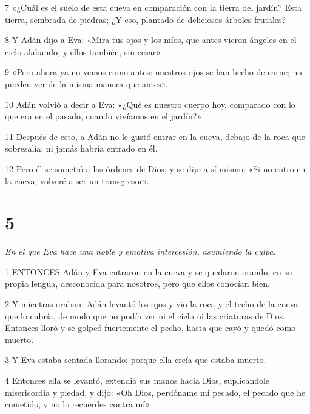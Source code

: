 \par 7 «¿Cuál es el suelo de esta cueva en comparación con la tierra del jardín? Esta tierra, sembrada de piedras; ¿Y eso, plantado de deliciosos árboles frutales?

\par 8 Y Adán dijo a Eva: «Mira tus ojos y los míos, que antes vieron ángeles en el cielo alabando; y ellos también, sin cesar».

\par 9 «Pero ahora ya no vemos como antes: nuestros ojos se han hecho de carne; no pueden ver de la misma manera que antes».

\par 10 Adán volvió a decir a Eva: «¿Qué es nuestro cuerpo hoy, comparado con lo que era en el pasado, cuando vivíamos en el jardín?»

\par 11 Después de esto, a Adán no le gustó entrar en la cueva, debajo de la roca que sobresalía; ni jamás habría entrado en él.

\par 12 Pero él se sometió a las órdenes de Dios; y se dijo a sí mismo: «Si no entro en la cueva, volveré a ser un transgresor».

\chapter{5}

\par \textit{En el que Eva hace una noble y emotiva intercesión, asumiendo la culpa.}

\par 1 ENTONCES Adán y Eva entraron en la cueva y se quedaron orando, en su propia lengua, desconocida para nosotros, pero que ellos conocían bien.

\par 2 Y mientras oraban, Adán levantó los ojos y vio la roca y el techo de la cueva que lo cubría, de modo que no podía ver ni el cielo ni las criaturas de Dios. Entonces lloró y se golpeó fuertemente el pecho, hasta que cayó y quedó como muerto.

\par 3 Y Eva estaba sentada llorando; porque ella creía que estaba muerto.

\par 4 Entonces ella se levantó, extendió sus manos hacia Dios, suplicándole misericordia y piedad, y dijo: «Oh Dios, perdóname mi pecado, el pecado que he cometido, y no lo recuerdes contra mí».

